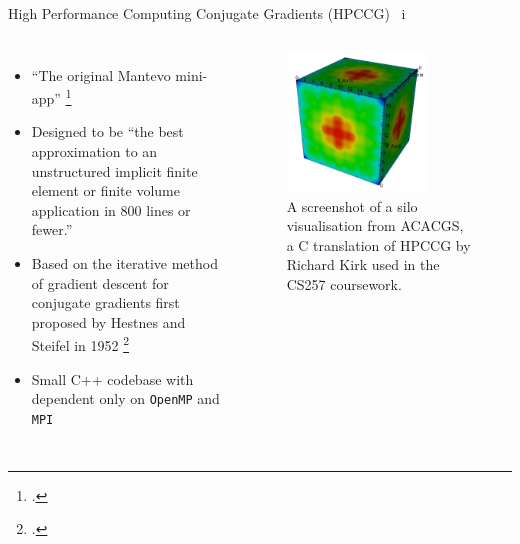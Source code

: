 \documentclass[10pt,aspectratio=169]{beamer}
\begin{document}
\begin{frame}{High Performance Computing Conjugate Gradients (HPCCG) \ i}
    \begin{columns}[onlytextwidth]
            \begin{itemize}
                \item ``The original Mantevo mini-app'' \footcite{MantevoHPCCG2023}
                \vspace{0.5cm}
                \item Designed to be ``the best approximation to an unstructured implicit finite element or finite volume application in 800 lines or fewer.''
                \item Based on the iterative method of gradient descent for conjugate gradients first proposed by Hestnes and Steifel in 1952 \footcite{hestenesMethodsConjugateGradients1952}
                \item Small C++ codebase with dependent only on \texttt{OpenMP} and \texttt{MPI}
            \end{itemize}
            \begin{figure}[H]
                \includegraphics[width=0.75\textwidth]{images/acacgs_silo_output.png}
                \captionsetup{width=.9\linewidth}
                \caption{A screenshot of a silo visualisation from ACACGS, a C translation of HPCCG by Richard Kirk used in the CS257 coursework.}
                \label{fig:warwick_mantevo_link}
            \end{figure}
    \end{columns}
\end{frame}
\end{document}
